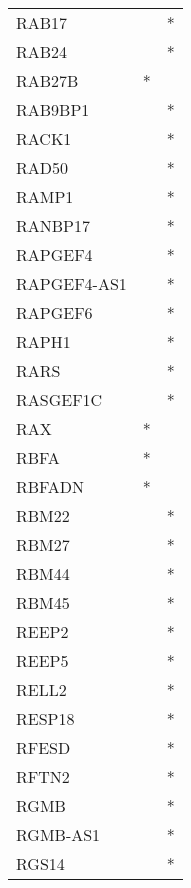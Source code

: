 \begin{longtable}{lcc}
RAB17           &                &          * \\
RAB24           &                &          * \\
RAB27B          &              * &            \\
RAB9BP1         &                &          * \\
RACK1           &                &          * \\
RAD50           &                &          * \\
RAMP1           &                &          * \\
RANBP17         &                &          * \\
RAPGEF4         &                &          * \\
RAPGEF4-AS1     &                &          * \\
RAPGEF6         &                &          * \\
RAPH1           &                &          * \\
RARS            &                &          * \\
RASGEF1C        &                &          * \\
RAX             &              * &            \\
RBFA            &              * &            \\
RBFADN          &              * &            \\
RBM22           &                &          * \\
RBM27           &                &          * \\
RBM44           &                &          * \\
RBM45           &                &          * \\
REEP2           &                &          * \\
REEP5           &                &          * \\
RELL2           &                &          * \\
RESP18          &                &          * \\
RFESD           &                &          * \\
RFTN2           &                &          * \\
RGMB            &                &          * \\
RGMB-AS1        &                &          * \\
RGS14           &                &          * \\

\end{longtable}
